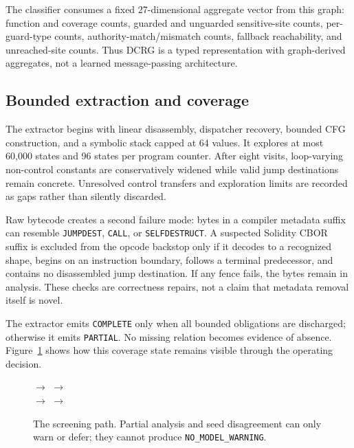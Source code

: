 \documentclass[conference]{IEEEtran}
\newcommand{\code}[1]{\texttt{#1}}
\begin{document}
The classifier consumes a fixed 27-dimensional aggregate vector from this graph: function and
coverage counts, guarded and unguarded sensitive-site counts, per-guard-type counts,
authority-match/mismatch counts, fallback reachability, and unreached-site counts. Thus DCRG is a
typed representation with graph-derived aggregates, not a learned message-passing architecture.

\subsection{Bounded extraction and coverage}

The extractor begins with linear disassembly, dispatcher recovery, bounded CFG construction, and a
symbolic stack capped at 64 values. It explores at most 60,000 states and 96 states per program
counter. After eight visits, loop-varying non-control constants are conservatively widened while
valid jump destinations remain concrete. Unresolved control transfers and exploration limits are
recorded as gaps rather than silently discarded.

Raw bytecode creates a second failure mode: bytes in a compiler metadata suffix can resemble
\code{JUMPDEST}, \code{CALL}, or \code{SELFDESTRUCT}. A suspected Solidity CBOR suffix is excluded
from the opcode backstop only if it decodes to a recognized shape, begins on an instruction
boundary, follows a terminal predecessor, and contains no disassembled jump destination. If any
fence fails, the bytes remain in analysis. These checks are correctness repairs, not a claim that
metadata removal itself is novel.

The extractor emits \code{COMPLETE} only when all bounded obligations are discharged; otherwise it
emits \code{PARTIAL}. No missing relation becomes evidence of absence. Figure~\ref{fig:workflow}
shows how this coverage state remains visible through the operating decision.

\begin{figure}[t]
\centering
\small
\setlength{\fboxsep}{3pt}
$\rightarrow$ 
$\rightarrow$ \\[3pt]
$\rightarrow$ 
$\rightarrow$ 
\caption{The screening path. Partial analysis and seed disagreement can only warn or defer; they
cannot produce \code{NO\_MODEL\_WARNING}.}
\label{fig:workflow}
\end{figure}
\end{document}
